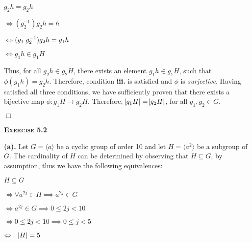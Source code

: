\documentclass[12pt, a4paper]{article}
\begin{document}
\hspace{55mm}$g_2 h=g_2 h$\par

\begin{description}
\item{$\Leftrightarrow$\hspace{1mm}}$(g^{-1}_2)g_2 h=h$
\item{$\Leftrightarrow$\hspace{1mm}}$(g_1\hspace{1mm} g^{-1}_2)g_2 h=g_1 h$
\item{$\Leftrightarrow$\hspace{1mm}}$g_1 h\in g_1 H$
\end{description}


Thus, for all $g_2 h\in g_2 H$, there exists an element $g_1 h\in g_1 H$, such that $\phi(g_1 h)=g_2 h$. Therefore, condition \textbf{iii.} is satisfied and $\phi$ is \textit{surjective}. Having satisfied all three conditions, we have sufficiently proven that there exists a bijective map $\phi\colon g_1 H\longrightarrow g_2 H$. Therefore, $\abs{g_1 H}=\abs{g_2 H}$, for all $g_1,g_2\in G$.

\hspace{150mm}$\Box$

\newpage

\begin{flushleft}
\textbf{\textsc{Exercise 5.2}}\par
\end{flushleft}

\vspace{6mm}

\textbf{(a). }Let $G=\langle a\rangle$ be a cyclic group of order 10 and let $H=\langle a^2\rangle$ be a subgroup of $G$. The cardinality of $H$ can be determined by observing that $H\subseteq G$, by assumption, thus we have the following equivalences:

\vspace{2mm}

\begin{description}
\item{$H\subseteq G$}
\item{$\Leftrightarrow$}\hspace{3mm}$\forall a^{2j}\in H\implies a^{2j}\in G$
\item{$\Leftrightarrow$}\hspace{3mm}$a^{2j}\in G\implies 0\leq 2j<10$
\item{$\Leftrightarrow$}\hspace{3mm}$0\leq 2j<10\implies 0\leq j<5$\par\vspace{1mm}\hspace{1mm} $\Leftrightarrow\hspace{3mm}\abs{H}=5$
\end{description}
\end{document}
